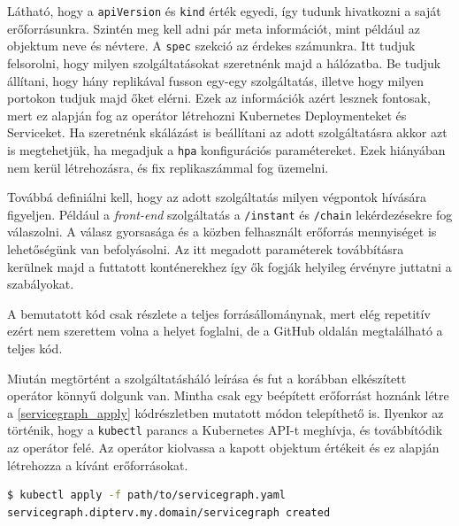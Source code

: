 Látható, hogy a \verb+apiVersion+ és \verb+kind+ érték egyedi, így tudunk hivatkozni a saját erőforrásunkra. Szintén meg kell adni pár meta információt, mint például az objektum neve és névtere. A \verb+spec+ szekció az érdekes számunkra. Itt tudjuk felsorolni, hogy milyen szolgáltatásokat szeretnénk majd a hálózatba. Be tudjuk állítani, hogy hány replikával fusson egy-egy szolgáltatás, illetve hogy milyen portokon tudjuk majd őket elérni. Ezek az információk azért lesznek fontosak, mert ez alapján fog az operátor létrehozni Kubernetes Deploymenteket és Serviceket. Ha szeretnénk skálázást is beállítani az adott szolgáltatásra akkor azt is megtehetjük, ha megadjuk a \verb+hpa+ konfigurációs paramétereket. Ezek hiányában nem kerül létrehozásra, és fix replikaszámmal fog üzemelni.

Továbbá definiálni kell, hogy az adott szolgáltatás milyen végpontok hívására figyeljen. Például a \textit{front-end} szolgáltatás a \verb+/instant+ és \verb+/chain+ lekérdezésekre fog válaszolni. A válasz gyorsasága és a közben felhasznált erőforrás mennyiséget is lehetőségünk van befolyásolni. Az itt megadott paraméterek továbbításra kerülnek majd a futtatott konténerekhez így ők fogják helyileg érvényre juttatni a szabályokat. 

A bemutatott kód csak részlete a teljes forrásállománynak, mert elég repetitív ezért nem szerettem volna a helyet foglalni, de a GitHub oldalán megtalálható a teljes kód. \\

\lstset{caption=Saját szolgáltatásháló definiálása, label=servicegraph_example}


Miután megtörtént a szolgáltatásháló leírása és fut a korábban elkészített operátor könnyű dolgunk van. Mintha csak egy beépített erőforrást hoznánk létre a \ref{servicegraph_apply} kódrészletben mutatott módon telepíthető is. 
Ilyenkor az történik, hogy a \verb+kubectl+ parancs a Kubernetes API-t meghívja, és továbbítódik az operátor felé. Az operátor kiolvassa a kapott objektum értékeit és ez alapján létrehozza a kívánt erőforrásokat. 

\lstset{caption=Szolgáltatásháló indítása, label=servicegraph_apply}
\begin{lstlisting}[language=bash,morekeywords={kubectl, apply},alsoletter={-},breaklines=true]
$ kubectl apply -f path/to/servicegraph.yaml                          
servicegraph.dipterv.my.domain/servicegraph created 
\end{lstlisting}


